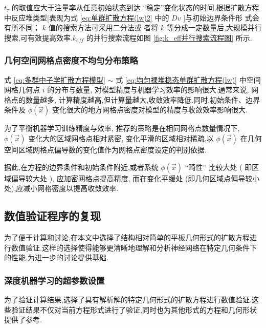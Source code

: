 \documentclass{Sichuan Normal University}
\begin{document}
$t_\tau$ 的取值应大于注量率从任意初始状态到达 “稳定”变化状态的时间,根据扩散方程中反应堆类型[表现为式 \eqref{eq:单群扩散方程(lw)2} 中的 $Dv$ ]与初始边界条件形 式会有所不同；
$k$ 值的搜索方法可采用二分法或 者将 $k$ 等分成一定数量后,大规模并行搜索,可有效提高效率.$k_{eff}$ 的并行搜索流程如图 \ref{fig:k_eff并行搜索流程图} 所示.

\subsubsection{几何空间网格点密度不均匀分布策略}\label{sec:几何空间网格点密度不均匀分布策略}
式 \eqref{eq:多群中子学扩散方程模型}  $\sim$ 式 \eqref{eq:均匀裸堆稳态单群扩散方程(lw)} 中空间网格几何点 $i$ 的分布与数量, 对模型精度与机器学习效率的影响很大.通常来说, 网格点的数量越多, 计算精度越高,但计算量越大,收敛效率降低.同时,初始条件、边界条件及 $\phi(\vec{x})$ 变化很大的地方网格点密度对模型的精度与收敛效率影响很大.

为了平衡机器学习训练精度与效率, 推荐的策略是在相同网格点数量情况下, $\phi(\vec{x})$ 变化大的区域网格点相对紧密, 变化平滑的区域相对稀疏,以 $\phi(\vec{x})$ 在几何空间区域网格点偏导数的变化值作为网格点密度设定的判别依据.

据此,在方程的边界条件和初始条件附近,或者系统 $\phi(\vec{x})$ “畸性” 比较大处 ( 即区域偏导较大处 ), 应加密网格点提高精度, 而在变化平缓处 (即几何区域点偏导较小处),应减小网格密度以提高收敛效率.
\subsection{数值验证程序的复现}

为了便于计算和讨论,在本文中选择了结构相对简单的平板几何形式的扩散方程进行数值验证.这样的选择使得能够更清晰地理解和分析神经网络在特定几何条件下的性能,为进一步的讨论提供基础.

\subsubsection{深度机器学习的超参数设置}

为了验证计算结果,选择了具有解析解的特定几何形式的扩散方程进行数值验证.这些验证结果不仅对当前方程形式进行了验证,同时也为其他形式的方程和几何形状提供了参考.
\end{document}
